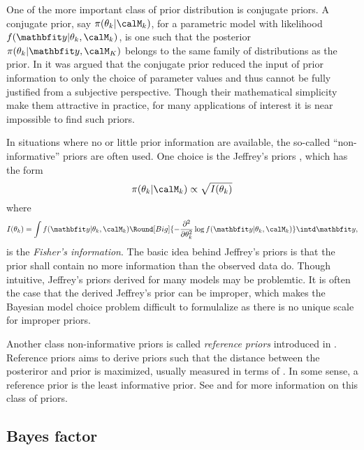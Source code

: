 One of the more important class of prior distribution is conjugate priors. A
conjugate prior, say $\pi(\theta_k|\calM_k)$, for a parametric model with
likelihood $f(\data|\theta_k,\calM_k)$, is one such that the posterior
$\pi(\theta_k|\data,\calM_K)$ belongs to the same family of distributions as
the prior. In \cite[][chap.~5]{Bernardo:1994vd} it was argued that the
conjugate prior reduced the input of prior information to only the choice of
parameter values and thus cannot be fully justified from a subjective
perspective. Though their mathematical simplicity make them attractive in
practice, for many applications of interest it is near impossible to find such
priors.

In situations where no or little prior information are available, the
so-called ``non-informative'' priors are often used. One choice is the
Jeffrey's priors \cite{Jeffreys:1946jf}, which has the form
\begin{equation}
  \pi(\theta_k|\calM_k)\propto\sqrt{I(\theta_k)}
\end{equation}
where
\begin{equation}
  I(\theta_k) = \int f(\data|\theta_k,\calM_k)\Round[Big]{
    -\frac{\partial^2}{\partial\theta_k^2}\log f(\data|\theta_k,\calM_k)}
  \intd\data,
\end{equation}
is the \emph{Fisher's information}. The basic idea behind Jeffrey's priors is
that the prior shall contain no more information than the observed data do.
Though intuitive, Jeffrey's priors derived for many models may be problemtic.
It is often the case that the derived Jeffrey's prior can be improper, which
makes the Bayesian model choice problem difficult to formulalize as there is
no unique scale for improper priors.

Another class non-informative priors is called \emph{reference priors}
introduced in \cite{Bernardo:1979uq}. Reference priors aims to derive priors
such that the distance between the posteriror and prior is maximized, usually
measured in terms of \kl \cite{Kullback:1951va}. In some sense, a reference
prior is the least informative prior. See \cite{Berger:1989vj, Berger:1992kf,
  Berger:1992wo} and \cite[][sec.~5.4]{Bernardo:1994vd} for more information
on this class of priors.

\subsection{Bayes factor}
\label{sub:Bayes factor}


